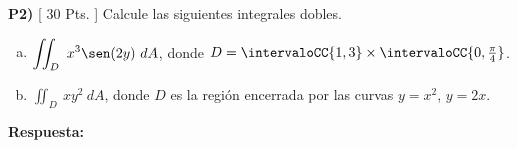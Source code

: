 \documentclass{article}
\begin{document}
\newpage
\noindent\textbf{P2) } \textsf{[ 30 Pts. ] } Calcule las siguientes integrales dobles.
  \begin{enumerate}[a)]
    \item $\displaystyle\iint_{D}\ x^3\sen(2y)\ dA$, donde $D = \intervaloCC{1,3}\times\intervaloCC{0,\frac{\pi}{4}}$.
    \item $\displaystyle\iint_{D}\ xy^2\ dA$, donde $D$ es la región encerrada por las curvas $y=x^2$, $y=2x$.
  \end{enumerate}

\vspace{2mm}
\noindent\textbf{Respuesta:}
\end{document}
